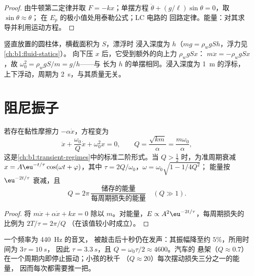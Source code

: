 \begin{proof}
由牛顿第二定律并取 $F = -kx$；单摆方程
$\ddot\theta + (g/\ell)\sin\theta = 0$，取 $\sin\theta \approx \theta$；
在 $E_p$ 的极小值处用泰勒公式；LC 电路的
回路定律。能量：对其求导并利用运动方程。
\end{proof}

\begin{example}[上下浮动的圆柱体]\label{ex:b1:oscillators-resonance:bob}
竖直放置的圆柱体，横截面积为 $S$，漂浮时
浸入深度为 $h$（$mg = \rho_wgSh$，浮力见\cref{ch:b1:fluid-statics}）。
向下压 $x$ 后，它受到额外的向上力 $\rho_wgSx$：
$m\ddot x = -\rho_wgSx$，故 $\omega_0^2 = \rho_wgS/m = g/h$——与
长为 $h$ 的单摆相同。浸入深度为 \qty{1}{m} 的浮标，
上下浮动，周期为 \qty{2}{s}，与其质量无关。
\end{example}

\section{阻尼振子}

\begin{proposition}[阻尼振子]\label{prop:b1:oscillators-resonance:damped}
若存在黏性摩擦力 $-\alpha\dot x$，方程变为
\[
\ddot x + \frac{\omega_0}{Q}\dot x + \omega_0^2x = 0, \qquad
Q = \frac{\sqrt{km}}{\alpha} = \frac{m\omega_0}{\alpha},
\]
这是\cref{ch:b1:transient-regimes}中的标准二阶形式。当
$Q > \tfrac12$ 时，为准周期衰减 $x = A\eu^{-t/\tau}\cos(\omega t +
\varphi)$，其中 $\tau = 2Q/\omega_0$，$\omega = \omega_0\sqrt{1 - 1/4Q^2}$；
能量按 $\eu^{-2t/\tau}$ 衰减，且
\[
Q = 2\pi\,\frac{\text{储存的能量}}{\text{每周期损失的能量}}
\quad (Q \gg 1) .
\]
\end{proposition}

\begin{proof}
将 $m\ddot x + \alpha\dot x + kx = 0$ 除以 $m$。对能量，$E
\propto A^2\eu^{-2t/\tau}$，每周期损失的比例为 $2T/\tau = 2\pi/Q$
（在该值较小时成立）。
\end{proof}

\begin{example}[余音时长]\label{ex:b1:oscillators-resonance:ringing}
一个频率为 \qty{440}{Hz} 的音叉，
被敲击后十秒仍在发声：其振幅降至约 $5\%$，所用时间为 $3\tau = \qty{10}{s}$，
因此 $\tau = \qty{3.3}{s}$，且 $Q = \omega_0\tau/2 \approx 4600$。汽车的
悬架（$Q \approx 0.7$）在一个周期内即停止振动；小孩的秋千
（$Q \approx 20$）每次摆动损失三分之一的能量，
因而每次都需要推一把。
\end{example}


